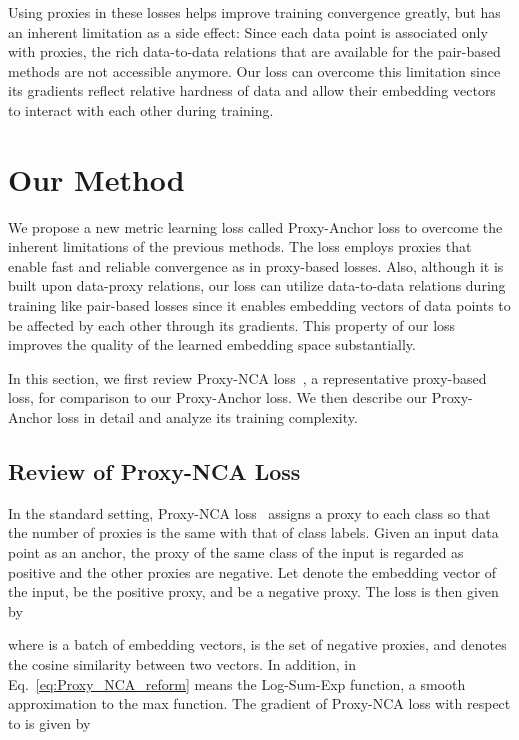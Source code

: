 \documentclass[10pt,twocolumn,letterpaper]{article}
\begin{document}
Using proxies in these losses helps improve training convergence greatly, but has an inherent limitation as a side effect: Since each data point is associated only with proxies, the rich data-to-data relations that are available for the pair-based methods are not accessible anymore. 
Our loss can overcome this limitation since its gradients reflect relative hardness of data and allow their embedding vectors to interact with each other during training.

%
 



\section{Our Method}
\label{sec:method}





We propose a new metric learning loss called Proxy-Anchor loss to overcome the inherent limitations of the previous methods.
The loss employs proxies that enable fast and reliable convergence as in proxy-based losses. 
Also, although it is built upon data-proxy relations, our loss can utilize data-to-data relations during training like pair-based losses since it enables embedding vectors of data points to be affected by each other through its gradients.
This property of our loss improves the quality of the learned embedding space substantially.

In this section, we first review Proxy-NCA loss~\cite{movshovitz2017no}, a representative proxy-based loss, for comparison to our Proxy-Anchor loss.
We then describe our Proxy-Anchor loss in detail and analyze its training complexity. 




\subsection{Review of Proxy-NCA Loss}
\label{sec:proxy_nca}
In the standard setting, Proxy-NCA loss~\cite{movshovitz2017no} assigns a proxy to each class so that the number of proxies is the same with that of class labels.
Given an input data point as an anchor, the proxy of the same class of the input is regarded as positive and the other proxies are negative. 
Let  denote the embedding vector of the input,  be the positive proxy, and  be a negative proxy.
The loss is then given by

where  is a batch of embedding vectors,  is the set of negative proxies, and  denotes the cosine similarity between two vectors.
In addition,  in Eq.~\eqref{eq:Proxy_NCA_reform} means the Log-Sum-Exp function, a smooth approximation to the max function.
The gradient of Proxy-NCA loss with respect to  is given by
\end{document}
